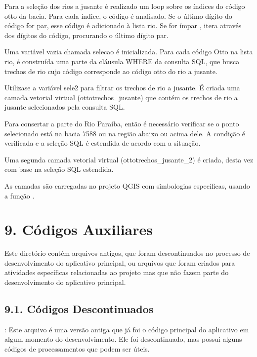 \documentclass[a4paper,10pt,brazil]{sphinxmanual}
\begin{document}
\sphinxAtStartPar
Para a seleção dos rios a jusante é realizado um loop sobre os índices do código otto da bacia. Para cada índice, o código é analisado. Se o último dígito do código for par, esse código é adicionado à lista rio. Se for ímpar , itera através dos dígitos do código, procurando o último dígito par.

\sphinxAtStartPar
Uma variável vazia chamada selecao é inicializada. Para cada código Otto na lista rio, é construída uma parte da cláusula WHERE da consulta SQL, que busca trechos de rio cujo código corresponde ao código otto do rio a jusante.

\sphinxAtStartPar
Utiliza\sphinxhyphen{}se a variável sele2 para filtrar os trechos de rio a jusante.
É criada uma camada vetorial virtual (ottotrechos\_jusante) que contém os trechos de rio a jusante selecionados pela consulta SQL.

\sphinxAtStartPar
Para consertar a parte do Rio Paraíba, então é necessário verificar se o ponto selecionado está na bacia 7588 ou na região abaixo ou acima dele. A condição é verificada e a seleção SQL é estendida de acordo com a situação.

\sphinxAtStartPar
Uma segunda camada vetorial virtual (ottotrechos\_jusante\_2) é criada, desta vez com base na seleção SQL estendida.

\sphinxAtStartPar
As camadas são carregadas no projeto QGIS com simbologias específicas, usando a função .

\sphinxstepscope


\section{9. Códigos Auxiliares}
\label{\detokenize{9codigosAuxiliares:codigos-auxiliares}}\label{\detokenize{9codigosAuxiliares::doc}}
\sphinxAtStartPar
Este diretório contém arquivos antigos, que foram descontinuados no processo de desenvolvimento do aplicativo principal, ou arquivos que foram criados para atividades específicas relacionadas ao projeto mas que não fazem parte do desenvolvimento do aplicativo principal.


\subsection{9.1. Códigos Descontinuados}
\label{\detokenize{9codigosAuxiliares:codigos-descontinuados}}
\sphinxAtStartPar
{}: Este arquivo é uma versão antiga que já foi o código principal do aplicativo em algum momento do desenvolvimento. Ele foi descontinuado, mas possui alguns códigos de processamentos que podem ser úteis.
\end{document}
